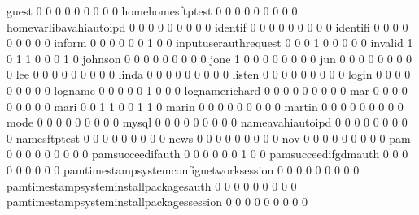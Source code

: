 \documentclass[compress,8pt]{beamer}
\begin{document}
\begin{frame}
\begin{Schunk}
  guest                                      0   0   0   0   0   0   0   0   0
  homehomesftptest                           0   0   0   0   0   0   0   0   0
  homevarlibavahiautoipd                     0   0   0   0   0   0   0   0   0
  identif                                    0   0   0   0   0   0   0   0   0
  identifi                                   0   0   0   0   0   0   0   0   0
  inform                                     0   0   0   0   0   0   1   0   0
  inputuserauthrequest                       0   0   0   1   0   0   0   0   0
  invalid                                    1   0   1   1   0   0   0   1   0
  johnson                                    0   0   0   0   0   0   0   0   0
  jone                                       1   0   0   0   0   0   0   0   0
  jun                                        0   0   0   0   0   0   0   0   0
  lee                                        0   0   0   0   0   0   0   0   0
  linda                                      0   0   0   0   0   0   0   0   0
  listen                                     0   0   0   0   0   0   0   0   0
  login                                      0   0   0   0   0   0   0   0   0
  logname                                    0   0   0   0   0   1   0   0   0
  lognamerichard                             0   0   0   0   0   0   0   0   0
  mar                                        0   0   0   0   0   0   0   0   0
  mari                                       0   0   1   1   0   0   1   1   0
  marin                                      0   0   0   0   0   0   0   0   0
  martin                                     0   0   0   0   0   0   0   0   0
  mode                                       0   0   0   0   0   0   0   0   0
  mysql                                      0   0   0   0   0   0   0   0   0
  nameavahiautoipd                           0   0   0   0   0   0   0   0   0
  namesftptest                               0   0   0   0   0   0   0   0   0
  news                                       0   0   0   0   0   0   0   0   0
  nov                                        0   0   0   0   0   0   0   0   0
  pam                                        0   0   0   0   0   0   0   0   0
  pamsucceedifauth                           0   0   0   0   0   0   1   0   0
  pamsucceedifgdmauth                        0   0   0   0   0   0   0   0   0
  pamtimestampsystemconfignetworksession     0   0   0   0   0   0   0   0   0
  pamtimestampsysteminstallpackagesauth      0   0   0   0   0   0   0   0   0
  pamtimestampsysteminstallpackagessession   0   0   0   0   0   0   0   0   0

\end{Schunk}
\end{frame}
\end{document}
